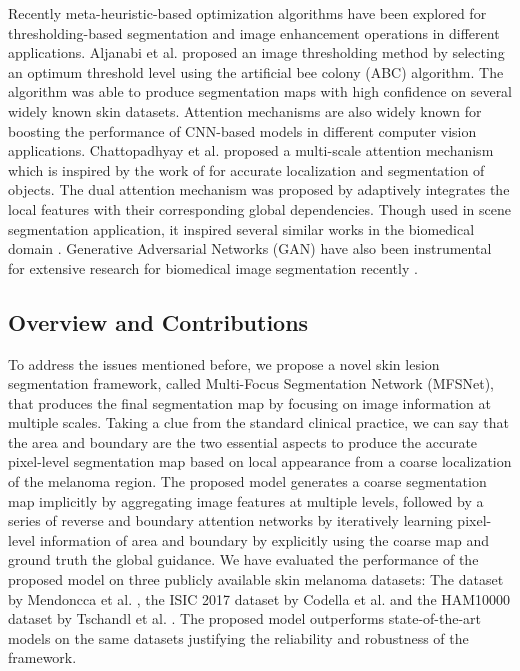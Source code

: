 \documentclass[review]{elsarticle}
\begin{document}
Recently meta-heuristic-based optimization algorithms have been explored for thresholding-based segmentation and image enhancement operations in different applications. Aljanabi et al. \cite{aljanabi2018skin} proposed an image thresholding method by selecting an optimum threshold level using the artificial bee colony (ABC) algorithm. The algorithm was able to produce segmentation maps with high confidence on several widely known skin datasets. Attention mechanisms are also widely known for boosting the performance of CNN-based models in different computer vision applications. Chattopadhyay et al. \cite{chattopadhyay2020multi} proposed a multi-scale attention mechanism which is inspired by the work of \cite{bi2020multi} for accurate localization and segmentation of objects. The dual attention mechanism was proposed by \cite{fu2019dual} adaptively integrates the local features with their corresponding global dependencies. Though used in scene segmentation application, it inspired several similar works in the biomedical domain \cite{barata2021explainable}. Generative Adversarial Networks (GAN) have also been instrumental for extensive research for biomedical image segmentation recently \cite{lei2020skin}.


\subsection{Overview and Contributions}
To address the issues mentioned before, we propose a novel skin lesion segmentation framework, called Multi-Focus Segmentation Network (MFSNet), that produces the final segmentation map by focusing on image information at multiple scales. Taking a clue from the standard clinical practice, we can say that the area and boundary are the two essential aspects to produce the accurate pixel-level segmentation map based on local appearance from a coarse localization of the melanoma region. The proposed model generates a coarse segmentation map implicitly by aggregating image features at multiple levels, followed by a series of reverse and boundary attention networks by iteratively learning pixel-level information of area and boundary by explicitly using the coarse map and ground truth the global guidance. We have evaluated the performance of the proposed model on three publicly available skin melanoma datasets: The  dataset by Mendoncca et al. \cite{mendoncca2013ph}, the ISIC 2017 dataset by Codella et al. \cite{codella2018skin} and the HAM10000 dataset by Tschandl et al. \cite{tschandl2018ham10000}. The proposed model outperforms state-of-the-art models on the same datasets justifying the reliability and robustness of the framework.
\end{document}
